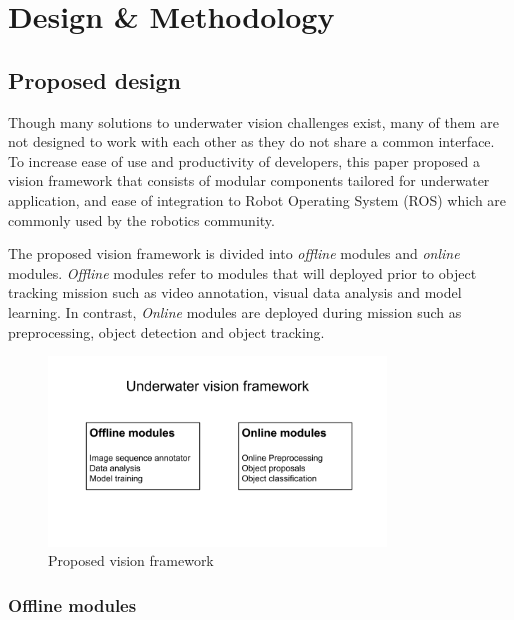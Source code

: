 \documentclass[hyp]{socreport}
\begin{document}

\chapter{Design \& Methodology}

\section{Proposed design}

Though many solutions to underwater vision challenges exist, many of them are
not designed to work with each other as they do not share a common interface. To
increase ease of use and productivity of developers, this paper proposed a
vision framework that consists of modular components tailored for underwater
application, and ease of integration to Robot Operating System (ROS) which are
commonly used by the robotics community.

The proposed vision framework is divided into \textit{offline} modules and
\textit{online} modules. \textit{Offline} modules refer to modules that will
deployed prior to object tracking mission such as video annotation, visual data
analysis and model learning. In contrast, \textit{Online} modules are deployed
during mission such as preprocessing, object detection and object tracking.

\begin{figure}[H]
\centering
  \includegraphics[width=0.8\textwidth, height=0.3\textheight]{framework.png}
  \caption{Proposed vision framework}
  \label{fig:proposed_vision_framework}
\end{figure}

\subsection{Offline modules}
\end{document}
